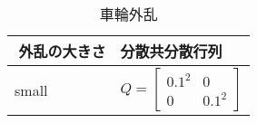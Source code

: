 \begin{table}[h]
    \caption{車輪外乱}
    \label{table:table2}
    \centering
    \begin{tabular}{ll}
        \hline
        外乱の大きさ & 分散共分散行列 \\
        \hline \hline
        small & 
        \begin{equation} 
            Q = 
            \begin{bmatrix}
            0.1^2 &0 \\
            0     &0.1^2 
            \end{bmatrix}
        \end{equation} \\
       \hline
    \end{tabular}
\end{table}
